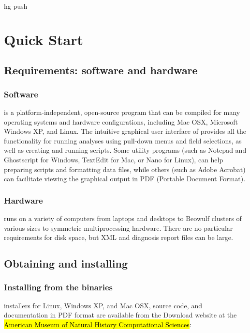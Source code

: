 hg push\chapter{\poy Quick Start}

\section{Requirements: software and hardware}

\subsection{Software}
\poy is a platform-independent, open-source program that can be compiled for many operating systems and hardware configurations, including Mac OSX, Microsoft Windows XP, and Linux. %
The intuitive graphical user interface of \poy provides all the functionality for running analyses using pull-down menus and field selections, as well as creating and running \poy scripts. Some utility programs (such as Notepad and Ghostscript for Windows, TextEdit for Mac, or Nano for Linux), can help preparing \poy scripts and formatting data files, while others (such as Adobe Acrobat) can facilitate viewing the graphical output in PDF (Portable Document Format).

\subsection{Hardware}
\poy runs on a variety of computers from laptops and desktops to Beowulf clusters 
of various sizes to symmetric multiprocessing hardware. There are no
particular requirements for disk space, but XML and diagnosis report files can be large.

\section{Obtaining and installing \poy}
\subsection{Installing from the binaries}
\poy installers for Linux, Windows XP, and Mac OSX, source code, and documentation in PDF format are available from the \poy Download website at the \hl{American Museum of Natural History Computational Sciences}:

